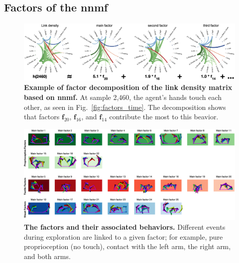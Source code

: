 \documentclass[letterpaper, 10 pt, conference]{ieeeconf}  %
\begin{document}
\subsection{Factors of the \ac{nnmf}}
\begin{figure}[h!]
    \centering
    \includegraphics[width=1\linewidth]{fig/factors_decomposition_final.png}
    \caption{\textbf{Example of factor decomposition of the link density matrix based on \ac{nnmf}.} At sample 2,460, the agent's hands touch each other, as seen in Fig.~\ref{fig:factors_time}. The decomposition shows that factors $\bm{f}_{20}$, $\bm{f}_{16}$, and $\bm{f}_{14}$ contribute the most to this beavior.}
    \label{fig:decomposition}
\end{figure}
\begin{figure}[!t]
	\begin{center}
		\hspace*{\fill}
        \includegraphics[width=1\textwidth]{fig/mainfactors_represente.png}
		\hspace*{\fill}
	\end{center}
    \vspace{-25pt}
	\caption{\textbf{The factors and their associated behaviors.} Different events during exploration are linked to a given factor; for example, pure proprioception (no touch), contact with the left arm, the right arm, and both arms.}
    \label{fig:main_factors}
\end{figure}
 
\end{document}

